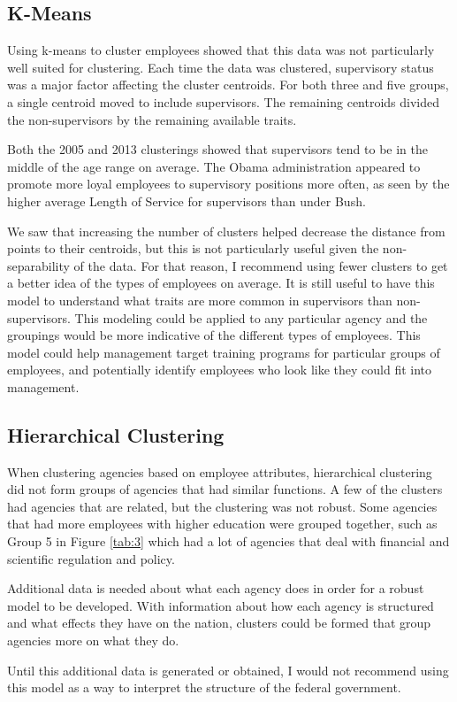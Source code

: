 \documentclass{article}
\begin{document}
    \subsection{K-Means}
    Using k-means to cluster employees showed that this data was not particularly well suited for clustering. Each time the data was clustered, supervisory status was a major factor affecting the cluster centroids. For both three and five groups, a single centroid moved to include supervisors. The remaining centroids divided the non-supervisors by the remaining available traits.
    \par
    Both the 2005 and 2013 clusterings showed that supervisors tend to be in the middle of the age range on average. The Obama administration appeared to promote more loyal employees to supervisory positions more often, as seen by the higher average Length of Service for supervisors than under Bush.
    \par
    We saw that increasing the number of clusters helped decrease the distance from points to their centroids, but this is not particularly useful given the non-separability of the data. For that reason, I recommend using fewer clusters to get a better idea of the types of employees on average. It is still useful to have this model to understand what traits are more common in supervisors than non-supervisors. This modeling could be applied to any particular agency and the groupings would be more indicative of the different types of employees. This model could help management target training programs for particular groups of employees, and potentially identify employees who look like they could fit into management.

    \subsection{Hierarchical Clustering}
    When clustering agencies based on employee attributes, hierarchical clustering did not form groups of agencies that had similar functions. A few of the clusters had agencies that are related, but the clustering was not robust. Some agencies that had more employees with higher education were grouped together, such as Group 5 in Figure \ref{tab:3} which had a lot of agencies that deal with financial and scientific regulation and policy.
    \par
    Additional data is needed about what each agency does in order for a robust model to be developed. With information about how each agency is structured and what effects they have on the nation, clusters could be formed that group agencies more on what they do.
    \par
    Until this additional data is generated or obtained, I would not recommend using this model as a way to interpret the structure of the federal government.
\end{document}
